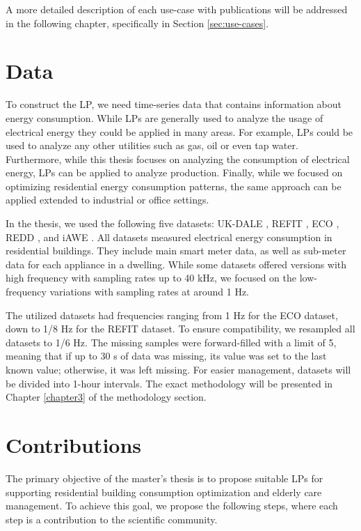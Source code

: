 A more detailed description of each use-case with publications will be addressed in the following chapter, specifically in Section \ref{sec:use-cases}.

\section{Data}
\label{sec:data}

To construct the LP, we need time-series data that contains information about energy consumption.
While LPs are generally used to analyze the usage of electrical energy they could be applied in many areas.
For example, LPs could be used to analyze any other utilities such as gas, oil or even tap water. 
Furthermore, while this thesis focuses on analyzing the consumption of electrical energy, LPs can be applied to analyze production.
Finally, while we focused on optimizing residential energy consumption patterns, the same approach can be applied extended to industrial or office settings.

In the thesis, we used the following five datasets:
 UK-DALE \cite{UKDALE}, REFIT \cite{REFIT}, ECO \cite{ECO}, REDD \cite{REDD}, and iAWE \cite{iAWE}.
All datasets measured electrical energy consumption in residential buildings.
They include main smart meter data, as well as sub-meter data for each appliance in a dwelling. 
While some datasets offered versions with high frequency with sampling rates up to 40 kHz,
we focused on the low-frequency variations with sampling rates at around 1 Hz.

The utilized datasets had frequencies ranging from 1 Hz for the ECO dataset, down to 1/8 Hz for the REFIT dataset.
To ensure compatibility, we resampled all datasets to 1/6 Hz.
The missing samples were forward-filled with a limit of 5, meaning that if up to 30 s of data was missing, its value was set to the last known value; otherwise, it was left missing.
For easier management, datasets will be divided into 1-hour intervals.
The exact methodology will be presented in Chapter \ref{chapter3} of the methodology section.

\section{Contributions}
\label{sec:contributions} 

The primary objective of the master's thesis is to propose suitable LPs for supporting residential building consumption optimization and elderly care management.
To achieve this goal, we propose the following steps, where each step is a contribution to the scientific community.

